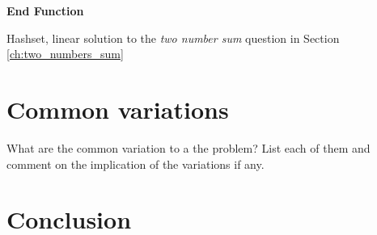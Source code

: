 \begin{algorithm}
	
	\textbf{End Function}
	\label{algo:two_numbers_sum_hashset_wrong}
	\caption{Hashset, linear solution to the \textit{two number sum} question in Section \ref{ch:two_numbers_sum} }
\end{algorithm}





\section{Common variations}
What are the common variation to a the problem?
List each of them and comment on the implication of the variations if any.

\section{Conclusion}
